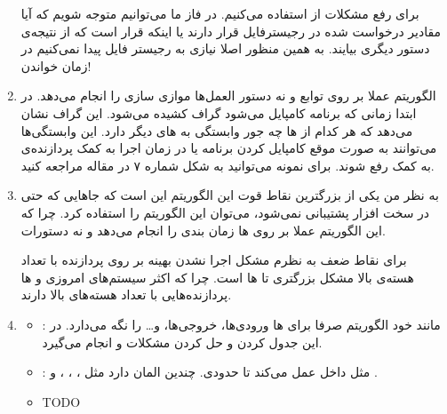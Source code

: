 \begin{enumerate}
    برای رفع مشکلات
    از
    استفاده می‌کنیم. در فاز
    ما می‌توانیم متوجه شویم که آیا مقادیر درخواست شده در رجیسترفایل قرار دارند یا اینکه
    قرار است که از نتیجه‌ی دستور دیگری بیایند. به همین منظور اصلا نیازی به رجیستر فایل پیدا نمی‌کنیم در
    زمان خواندن!
    \item الگوریتم  عملا بر روی توابع و نه دستور العمل‌ها موازی سازی را انجام می‌دهد.
    در ابتدا زمانی که برنامه کامپایل می‌شود گراف
    کشیده می‌شود. این گراف نشان می‌دهد که هر کدام از
    ها
    چه جور وابستگی به
    های
    دیگر دارد. این وابستگی‌ها می‌توانند به صورت
    موقع کامپایل کردن برنامه یا در زمان اجرا به کمک پردازنده‌ی
    به کمک
    رفع شوند. برای نمونه می‌توانید به شکل شماره ۷ در مقاله مراجعه کنید.
    \item به نظر من یکی از بزرگترین نقاط قوت این الگوریتم این است که جاهایی که
    حتی در سخت افزار پشتیبانی نمی‌شود،‌ می‌توان این الگوریتم را استفاده کرد. چرا که این الگوریتم عملا
    بر روی
    ها
    زمان بندی را انجام می‌دهد و نه دستورات.

    برای نقاط ضعف به نظرم مشکل اجرا نشدن بهینه بر روی پردازنده‌ با تعداد هسته‌ی بالا مشکل بزرگتری تا
    ها
    است. چرا که اکثر سیستم‌های امروزی و
    ها
    پردازنده‌هایی با تعداد هسته‌های بالا دارند.
    \item \begin{itemize}
        \item {}: مانند خود الگوریتم 
        صرفا برای
        ها
        ورودی‌ها،‌ خروجی‌ها،
         و\dots
        را نگه می‌دارد. در این جدول
        کردن و حل کردن مشکلات
         و 
        انجام می‌گیرد.
        \item {}: مثل  داخل
        عمل می‌کند تا حدودی. چندین المان دارد مثل
        ،‌ ،‌ ،  و .
        \item TODO
    \end{itemize}
\end{enumerate}